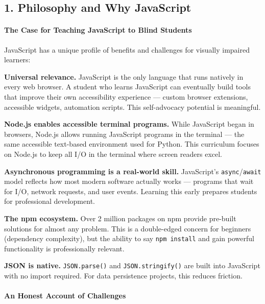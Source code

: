 \documentclass[
  justified,
  openright,
]{tufte-book}
\let\subsubsection\paragraph
\let\paragraph\paragraph
\let\subsubsection\paragraph
\let\paragraph\paragraph
\begin{document}
\subsection{1. Philosophy and Why
JavaScript}\label{philosophy-and-why-javascript}

\subsubsection{The Case for Teaching JavaScript to Blind
Students}\label{the-case-for-teaching-javascript-to-blind-students}

JavaScript has a unique profile of benefits and challenges for visually
impaired learners:

\textbf{Universal relevance.} JavaScript is the only language that runs
natively in every web browser. A student who learns JavaScript can
eventually build tools that improve their own accessibility experience
--- custom browser extensions, accessible widgets, automation scripts.
This self-advocacy potential is meaningful.

\textbf{Node.js enables accessible terminal programs.} While JavaScript
began in browsers, Node.js allows running JavaScript programs in the
terminal --- the same accessible text-based environment used for Python.
This curriculum focuses on Node.js to keep all I/O in the terminal where
screen readers excel.

\textbf{Asynchronous programming is a real-world skill.} JavaScript's
\texttt{async}/\texttt{await} model reflects how most modern software
actually works --- programs that wait for I/O, network requests, and
user events. Learning this early prepares students for professional
development.

\textbf{The npm ecosystem.} Over 2 million packages on npm provide
pre-built solutions for almost any problem. This is a double-edged
concern for beginners (dependency complexity), but the ability to say
\texttt{npm\ install} and gain powerful functionality is professionally
relevant.

\textbf{JSON is native.} \texttt{JSON.parse()} and
\texttt{JSON.stringify()} are built into JavaScript with no import
required. For data persistence projects, this reduces friction.

\subsubsection{An Honest Account of
Challenges}\label{an-honest-account-of-challenges}
\end{document}
